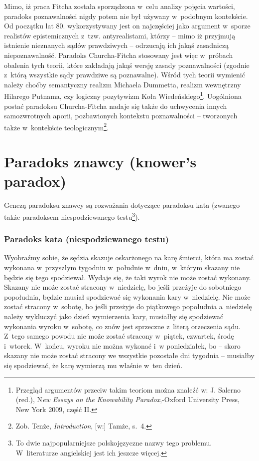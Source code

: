 Mimo, iż praca Fitcha została sporządzona w~celu analizy pojęcia wartości, paradoks poznawalności nigdy potem nie był używany w~podobnym kontekście. Od początku lat 80. wykorzystywany jest on najczęściej jako argument w~sporze realistów epistemicznych z~tzw. antyrealistami, którzy -- mimo iż przyjmują istnienie nieznanych sądów prawdziwych -- odrzucają ich jakąś zasadniczą niepoznawalność. Paradoks Churcha-Fitcha stosowany jest więc w~próbach obalenia tych teorii, które zakładają jakąś wersję zasady poznawalności (zgodnie z~którą wszystkie sądy prawdziwe są poznawalne). Wśród tych teorii wymienić należy choćby semantyczny realizm Michaela Dummetta, realizm wewnętrzny Hilarego Putnama, czy logiczny pozytywizm Koła Wiedeńskiego\footnote{Przegląd argumentów przeciw takim teoriom można znaleźć w: J. Salerno (red.), N\textit{ew Essays on the Knowability Paradox},-Oxford University Press, New York 2009, część II.}. Uogólniona postać paradoksu Churcha-Fitcha nadaje się także do uchwycenia innych samozwrotnych aporii, pozbawionych kontekstu poznawalności -- tworzonych także w~kontekście teologicznym\footnote{Zob. Tenże, \textit{Introduction}, [w:] Tamże, s.~4.}.

\section{Paradoks znawcy (knower's paradox)}

Genezą paradoksu znawcy są rozważania dotyczące paradoksu kata (zwanego także paradoksem niespodziewanego testu\footnote{To dwie najpopularniejsze polskojęzyczne nazwy tego problemu. W~literaturze angielskiej jest ich jeszcze więcej.}).

\subsubsection{Paradoks kata (niespodziewanego testu)}

Wyobraźmy sobie, że sędzia skazuje oskarżonego na karę śmierci, która ma zostać wykonana w~przyszłym tygodniu w~południe w~dniu, w~którym skazany nie będzie się tego spodziewał. Wydaje się, że taki wyrok nie może zostać wykonany. Skazany nie może zostać stracony w~niedzielę, bo jeśli przeżyje do sobotniego popołudnia, będzie musiał spodziewać się wykonania kary w~niedzielę. Nie może zostać stracony w~sobotę, bo jeśli przeżyje do piątkowego popołudnia a~niedzielę należy wykluczyć jako dzień wymierzenia kary, musiałby się spodziewać wykonania wyroku w~sobotę, co znów jest sprzeczne z~literą orzeczenia sądu. Z~tego samego powodu nie może zostać stracony w~piątek, czwartek, środę i~wtorek. W~końcu, wyroku nie można wykonać i~w poniedziałek, bo -- skoro skazany nie może zostać stracony we wszystkie pozostałe dni tygodnia -- musiałby się spodziewać, że karę wymierzą mu właśnie w~ten dzień.

